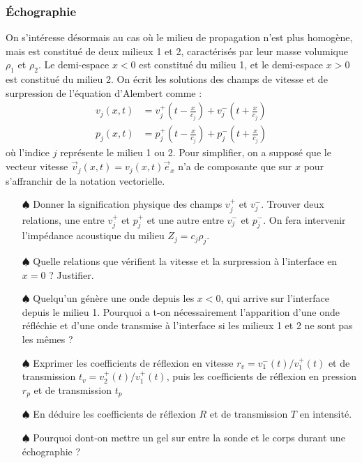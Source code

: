 \documentclass{report}
\begin{document}
\subsubsection*{Échographie}

On s'intéresse désormais au cas où le milieu de propagation n'est plus homogène, mais est constitué de deux milieux 1 et 2, caractérisés par leur masse volumique $\rho_1$ et $\rho_2$. Le demi-espace $x<0$ est constitué du milieu 1, et le demi-espace $x>0$ est constitué du milieu 2. On écrit les solutions des champs de vitesse et de surpression de l'équation d'Alembert comme : 
\begin{align*}
	v_j(x,t)&=v^+_{j}\left( t-\frac{x}{c_j}\right) + v^-_{j}\left( t+\frac{x}{c_j}\right) \\
	p_j(x,t)&=p^+_{j}\left( t-\frac{x}{c_j}\right) + p^-_{j}\left( t+\frac{x}{c_j}\right) 
\end{align*}
où l'indice $j$ représente le milieu 1 ou 2. Pour simplifier, on a supposé que le vecteur vitesse $\vec{v}_j(x,t)=v_j(x,t)\vec{e}_x$ n'a de composante que sur $x$ pour s'affranchir de la notation vectorielle. 

\begin{itemize}
	
	\item[$\spadesuit$] Donner la signification physique des champs $v^+_{j}$ et $v^-_{j}$. Trouver deux relations, une entre $v^+_{j}$ et $p^+_{j}$ et une autre entre $v^-_{j}$ et $p^-_{j}$. On fera intervenir l'impédance acoustique du milieu $Z_j=c_j\rho_j$.
	
	\item[$\spadesuit$] Quelle relations que vérifient la vitesse et la surpression à l'interface en $x=0$ ? Justifier. 
	
	\item[$\spadesuit$] Quelqu'un génère une onde depuis les $x<0$, qui arrive sur l'interface depuis le milieu 1. Pourquoi a t-on nécessairement l'apparition d'une onde réfléchie et d'une onde transmise à l'interface si les milieux 1 et 2 ne sont pas les mêmes ?
	
	\item[$\spadesuit$] Exprimer les coefficients de réflexion en vitesse $r_v=v_1^-(t)/v_1^+(t)$ et de transmission $t_v=v_2^+(t)/v_1^+(t)$, puis les coefficients de réflexion en pression $r_p$ et de transmission $t_p$
	
	\item[$\spadesuit$]	 En déduire les coefficients de réflexion $R$ et de transmission $T$ en intensité. 
	
	\item[$\spadesuit$] Pourquoi dont-on mettre un gel sur entre la sonde et le corps durant une échographie ? 
		
\end{itemize}
\end{document}
